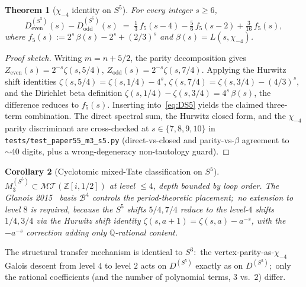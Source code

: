 \documentclass[11pt,a4paper]{article}
\theoremstyle{plain}
\newtheorem{theorem}{Theorem}[section]
\newtheorem{corollary}[theorem]{Corollary}
\theoremstyle{definition}
\newcommand{\sthree}{S^{3}}
\newcommand{\sfive}{S^{5}}
\newcommand{\Z}{\mathbb{Z}}
\newcommand{\Q}{\mathbb{Q}}
\newcommand{\MT}{\mathcal{MT}}
\newcommand{\Bcal}{\mathcal{B}}
\begin{document}
\begin{theorem}[$\chi_{-4}$ identity on $\sfive$]
\label{thm:m3_s5_chi4}
For every integer $s \ge 6$,
\begin{equation}
\label{eq:m3_s5_chi4}
D_{\mathrm{even}}^{(\sfive)}(s) - D_{\mathrm{odd}}^{(\sfive)}(s)
\;=\; \tfrac{1}{3}\, f_5(s - 4) - \tfrac{5}{6}\, f_5(s - 2) + \tfrac{3}{16}\, f_5(s),
\end{equation}
where
$f_5(s) := 2^s\,\beta(s) - 2^s + (2/3)^s$ and $\beta(s) = L(s, \chi_{-4})$.
\end{theorem}

\begin{proof}[Proof sketch]
Writing $m = n + 5/2$, the parity decomposition gives
$Z_{\mathrm{even}}(s) = 2^{-s}\zeta(s, 5/4)$,
$Z_{\mathrm{odd}}(s) = 2^{-s}\zeta(s, 7/4)$.
Applying the Hurwitz shift identities
$\zeta(s, 5/4) = \zeta(s, 1/4) - 4^s$,
$\zeta(s, 7/4) = \zeta(s, 3/4) - (4/3)^s$, and the Dirichlet beta
definition $\zeta(s, 1/4) - \zeta(s, 3/4) = 4^s\,\beta(s)$, the
difference reduces to $f_5(s)$.  Inserting into~\eqref{eq:DS5} yields
the claimed three-term combination.  The direct spectral sum, the
Hurwitz closed form, and the $\chi_{-4}$ parity discriminant are
cross-checked at $s \in \{7, 8, 9, 10\}$ in
\texttt{tests/test\_paper55\_m3\_s5.py} (direct-vs-closed and
parity-vs-$\beta$ agreement to $\sim 40$ digits, plus a
wrong-degeneracy non-tautology guard).
\end{proof}

\begin{corollary}[Cyclotomic mixed-Tate classification on $\sfive$]
\label{cor:m3_s5_cyclotomic}
$M_3^{(\sfive)} \subset \MT(\Z[i, 1/2])$ at level $\le 4$, depth
bounded by loop order.  The Glanois 2015~\cite{glanois2015} basis $\Bcal^4$
controls the period-theoretic placement;\ no extension to level $8$ is
required, because the $\sfive$ shifts $5/4, 7/4$ reduce to the
level-$4$ shifts $1/4, 3/4$ via the Hurwitz shift identity
$\zeta(s, a + 1) = \zeta(s, a) - a^{-s}$, with the $-a^{-s}$ correction
adding only $\Q$-rational content.
\end{corollary}

The structural transfer mechanism is identical to $\sthree$:\ the
vertex-parity-as-$\chi_{-4}$ Galois descent from level $4$ to level $2$
acts on $D^{(\sfive)}$ exactly as on $D^{(\sthree)}$;\ only the rational
coefficients (and the number of polynomial terms, $3$ vs.\ $2$) differ.
\end{document}
